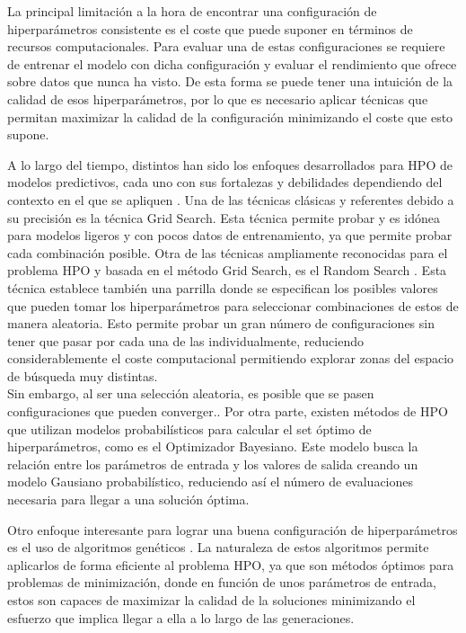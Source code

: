 \documentclass{uathesis-es}
\begin{document}
La principal limitación a la hora de encontrar una configuración de hiperparámetros consistente es el coste que puede suponer en términos de recursos computacionales. Para evaluar una de estas configuraciones se requiere de entrenar el modelo con dicha configuración y evaluar el rendimiento que ofrece sobre datos que nunca ha visto. De esta forma se puede tener una intuición de la calidad de esos hiperparámetros, por lo que es necesario aplicar técnicas que permitan maximizar la calidad de la configuración minimizando el coste que esto supone.


A lo largo del tiempo, distintos han sido los enfoques desarrollados para HPO de modelos predictivos, cada uno con sus fortalezas y debilidades dependiendo del contexto en el que se apliquen \cite{yu2020hyperparameter}. Una de las técnicas clásicas y referentes debido a su precisión es la técnica Grid Search. Esta técnica permite probar y es idónea para modelos ligeros y con pocos datos de entrenamiento, ya que permite probar cada combinación posible. Otra de las técnicas ampliamente reconocidas para el problema HPO y basada en el método Grid Search, es el Random Search \cite{bergstra2012random}. Esta técnica establece también una parrilla donde se especifican los posibles valores que pueden tomar los hiperparámetros para seleccionar combinaciones de estos de manera aleatoria. Esto permite probar un gran número de configuraciones sin tener que pasar por cada una de las individualmente, reduciendo considerablemente el coste computacional permitiendo explorar zonas del espacio de búsqueda muy distintas.\\ 
Sin embargo, al ser una selección aleatoria, es posible que se pasen configuraciones que pueden converger.. Por otra parte, existen métodos de HPO que utilizan modelos probabilísticos para calcular el set óptimo de hiperparámetros, como es el Optimizador Bayesiano. Este modelo busca la relación entre los parámetros de entrada y los valores de salida creando un modelo Gausiano probabilístico, reduciendo así el número de evaluaciones necesaria para llegar a una solución óptima.

Otro enfoque interesante para lograr una buena configuración de hiperparámetros es el uso de algoritmos genéticos \cite{alibrahim2021hyperparameter}. La naturaleza de estos algoritmos permite aplicarlos de forma eficiente al problema HPO, ya que son métodos óptimos para problemas de minimización, donde en función de unos parámetros de entrada, estos son capaces de maximizar la calidad de la soluciones minimizando el esfuerzo que implica llegar a ella a lo largo de las generaciones.
\end{document}
